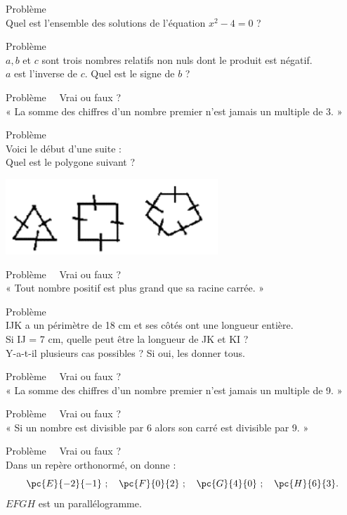 \documentclass[a4paper,11pt,exos]{nsi} %
\newcounter{pbNum}
\newcommand{\pb}[1]
{
	\addtocounter{pbNum}{1}
	{\titlefont\color{UGLiBlue}\Large Problème\ \thepbNum\ \normalsize{#1}}\smallskip	
}
\begin{document}
\pb{}\\
Quel est l’ensemble des solutions de l’équation $x^2-4=0$ ?\\

\pb{}\\
$a, b$ et $c$ sont trois nombres relatifs non nuls dont le produit est négatif.\\
$a$ est l’inverse de $c$. Quel est le signe de $b$ ?\\

\pb{ Vrai ou faux ?}\\
« La somme des chiffres d’un nombre premier n’est jamais un multiple de 3. »\\

\dleft{7cm}
{
    \pb{}\\
    Voici le début d'une suite :\\[.5em]
    Quel est le polygone suivant ?\\
}
{\includegraphics[width=8cm]{polynomes.png}}



\pb{ Vrai ou faux ?}\\
« Tout nombre positif est plus grand que sa racine carrée. »\\

\pb{}\\
IJK a un périmètre de 18 cm et ses côtés ont une longueur entière.\\
Si IJ = 7 cm, quelle peut être la longueur de JK et KI ?\\
Y-a-t-il plusieurs cas possibles ? Si oui, les donner tous.\\

\pb{ Vrai ou faux ?}\\
« La somme des chiffres d’un nombre premier n’est jamais un multiple de 9. »\\

\pb{ Vrai ou faux ?}\\
« Si un nombre est divisible par 6 alors son carré est divisible par 9. »\\

\pb{ Vrai ou faux ?}\\
Dans un repère orthonormé, on donne :
$$\pc{E}{-2}{-1}\ ;\quad \pc{F}{0}{2}\ ;\quad \pc{G}{4}{0}\ ;\quad \pc{H}{6}{3}.$$
$EFGH$ est un parallélogramme.\\
\end{document}
